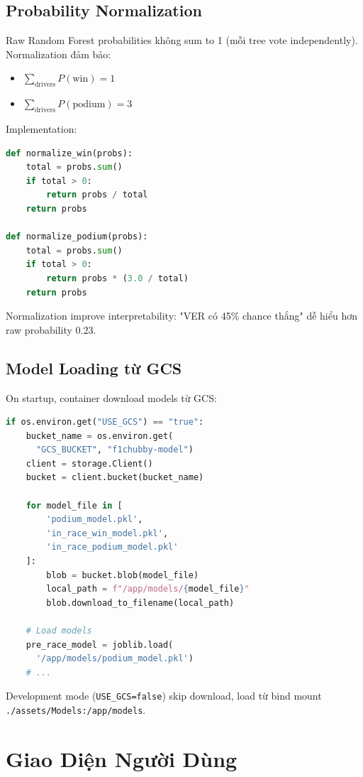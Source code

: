 \documentclass[conference,10pt]{IEEEtran}
\begin{document}
\subsection{Probability Normalization}

Raw Random Forest probabilities không sum to 1 (mỗi tree vote independently). Normalization đảm bảo:
\begin{itemize}
    \item $\sum_{\text{drivers}} P(\text{win}) = 1$
    \item $\sum_{\text{drivers}} P(\text{podium}) = 3$
\end{itemize}

Implementation:
\begin{lstlisting}[language=Python]
def normalize_win(probs):
    total = probs.sum()
    if total > 0:
        return probs / total
    return probs

def normalize_podium(probs):
    total = probs.sum()
    if total > 0:
        return probs * (3.0 / total)
    return probs
\end{lstlisting}

Normalization improve interpretability: "VER có 45\% chance thắng" dễ hiểu hơn raw probability 0.23.

\subsection{Model Loading từ GCS}

On startup, container download models từ GCS:

\begin{lstlisting}[language=Python]
if os.environ.get("USE_GCS") == "true":
    bucket_name = os.environ.get(
      "GCS_BUCKET", "f1chubby-model")
    client = storage.Client()
    bucket = client.bucket(bucket_name)

    for model_file in [
        'podium_model.pkl',
        'in_race_win_model.pkl',
        'in_race_podium_model.pkl'
    ]:
        blob = bucket.blob(model_file)
        local_path = f"/app/models/{model_file}"
        blob.download_to_filename(local_path)

    # Load models
    pre_race_model = joblib.load(
      '/app/models/podium_model.pkl')
    # ...
\end{lstlisting}

Development mode (\texttt{USE\_GCS=false}) skip download, load từ bind mount \texttt{./assets/Models:/app/models}.

\section{Giao Diện Người Dùng}
\end{document}
